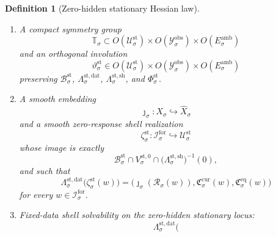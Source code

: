 \documentclass[11pt]{article}
\newcommand{\ForSpace}[1]{\mathcal I_{#1}^{\mathrm{for}}}
\newcommand{\Reduction}[1]{\mathcal R_{#1}}
\newcommand{\CurrentCarrier}[1]{\mathfrak C_{#1}^{\mathrm{cur}}}
\newcommand{\EqCarrier}[1]{\mathfrak C_{#1}^{\mathrm{eq}}}
\newcommand{\VisibleAffine}[1]{\widehat X_{#1}}
\newcommand{\DataSpace}[1]{\mathcal Y_{#1}^{\mathrm{obs}}}
\newcommand{\AmbientTarget}[1]{E_{#1}^{\mathrm{amb}}}
\newcommand{\StatSpace}[1]{\mathcal U_{#1}^{\mathrm{st}}}
\newcommand{\StatBody}[1]{\mathcal B_{#1}^{\mathrm{st}}}
\newcommand{\StatData}[1]{\Lambda_{#1}^{\mathrm{st,dat}}}
\newcommand{\StatShell}[1]{\Lambda_{#1}^{\mathrm{st,sh}}}
\newcommand{\StatPotential}[1]{\Phi_{#1}^{\mathrm{st}}}
\newcommand{\StatZero}[1]{V_{#1}^{\mathrm{st},0}}
\newcommand{\StatHidden}[1]{H_{#1}^{\mathrm{st}}}
\newcommand{\StatHess}[1]{\mathfrak H_{#1}^{\mathrm{st}}}
\newcommand{\StatSym}[1]{\mathbb T_{#1}}
\newcommand{\StatTime}[1]{\vartheta_{#1}^{\mathrm{st}}}
\newcommand{\StatEmbed}[1]{\zeta_{#1}^{\mathrm{st}}}
\newtheorem{definition}{Definition}
\begin{document}
\begin{definition}[Zero-hidden stationary Hessian law]
\begin{enumerate}
    \[
    \StatHess{\sigma}:
    \StatSpace{\sigma}\times\StatSpace{\sigma}\to\mathbb R
    \]
    such that for every \(z\in\StatZero{\sigma}\),
    \begin{equation}
    D\StatPotential{\sigma}(z)=0,
    \qquad
    D^{2}\StatPotential{\sigma}(z)[u,v]
    =
    \StatHess{\sigma}(u,v)
    \label{eq:commonhessian}
    \end{equation}
    for all \(u,v\in\StatSpace{\sigma}\). Assume moreover that
    \begin{equation}
    \StatHess{\sigma}(\delta z,u)=0
    \qquad
    \text{for all }\delta z\in\StatZero{\sigma},\;u\in\StatSpace{\sigma},
    \label{eq:hesszero}
    \end{equation}
    and that there exists \(\lambda_{\sigma}^{\mathrm{st}}>0\) with
    \begin{equation}
    \StatHess{\sigma}(\eta,\eta)
    \ge
    \lambda_{\sigma}^{\mathrm{st}}\,
    \|\eta\|^{2}
    \qquad
    \text{for all }\eta\in\StatHidden{\sigma}.
    \label{eq:stgap}
    \end{equation}
    \item A compact symmetry group
    \[
    \StatSym{\sigma}\subset
    O(\StatSpace{\sigma})\times
    O(\DataSpace{\sigma})\times
    O(\AmbientTarget{\sigma})
    \]
    and an orthogonal involution
    \[
    \StatTime{\sigma}\in
    O(\StatSpace{\sigma})\times
    O(\DataSpace{\sigma})\times
    O(\AmbientTarget{\sigma})
    \]
    preserving \(\StatBody{\sigma}\), \(\StatData{\sigma}\), \(\StatShell{\sigma}\), and \(\StatPotential{\sigma}\).
    \item A smooth embedding
    \[
    \jmath_{\sigma}:X_{\sigma}\hookrightarrow\VisibleAffine{\sigma}
    \]
    and a smooth zero-response shell realization
    \[
    \StatEmbed{\sigma}:\ForSpace{\sigma}\hookrightarrow\StatSpace{\sigma}
    \]
    whose image is exactly
    \[
    \StatBody{\sigma}\cap
    \StatZero{\sigma}\cap
    \bigl(\StatShell{\sigma}\bigr)^{-1}(0),
    \]
    and such that
    \begin{equation}
    \StatData{\sigma}\bigl(\StatEmbed{\sigma}(w)\bigr)
    =
    \bigl(
    \jmath_{\sigma}(\Reduction{\sigma}(w)),
    \CurrentCarrier{\sigma}(w),
    \EqCarrier{\sigma}(w)
    \bigr)
    \label{eq:statcompat}
    \end{equation}
    for every \(w\in\ForSpace{\sigma}\).
    \item Fixed-data shell solvability on the zero-hidden stationary locus:
    \begin{equation}
    \StatData{\sigma}\bigl(

\end{equation}
\end{enumerate}
\end{definition}
\end{document}
